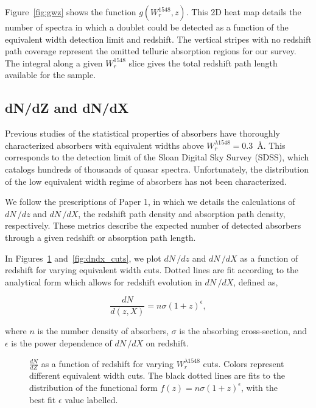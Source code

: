 \documentclass[linenumbers,twocolumn]{aastex61}
\begin{document}
Figure~\ref{fig:gwz} shows the function $g(W_r^{1548}, z)$. This 2D heat map details the number of spectra in which a {\CIVdblt} doublet could be detected as a function of the equivalent width detection limit and redshift. The vertical stripes with no redshift path coverage represent the omitted telluric absorption regions for our survey. The integral along a given $W_r^{1548}$ slice gives the total redshift path length available for the sample.

\subsection{dN/dZ and dN/dX}
\label{dndzdndx}

Previous studies of the statistical properties of {\CIV} absorbers have thoroughly characterized {\CIV} absorbers with equivalent widths above $W_r^{\lambda1548} = 0.3$~{\AA}. This corresponds to the detection limit of the Sloan Digital Sky Survey (SDSS), which catalogs hundreds of thousands of quasar spectra. Unfortunately, the distribution of the low equivalent width regime of {\CIV} absorbers has not been characterized.

We follow the prescriptions of Paper 1, in which we details the calculations of $dN\,/dz$ and $dN\,/dX$, the redshift path density and absorption path density, respectively. These metrics describe the expected number of detected absorbers through a given redshift or absorption path length.

In Figures~\ref{fig:dndz_cuts} and~\ref{fig:dndx_cuts}, we plot $dN\,/dz$ and $dN\,/dX$ as a function of redshift for varying equivalent width cuts. Dotted lines are fit according to the analytical form which allows for redshift evolution in $dN\,/dX$, defined as,

\begin{equation}
\frac{dN}{d(z,X)} = n\sigma (1 + z)^{\epsilon},
\label{eqn:dndxfit}
\end{equation}

where $n$ is the number density of {\CIV} absorbers, $\sigma$ is the absorbing cross-section, and $\epsilon$ is the power dependence of $dN\,/dX$ on redshift.

\begin{figure}[bth]
\caption{$\frac{dN}{dZ}$ as a function of redshift for varying $W_r^{\lambda1548}$ cuts. Colors represent different equivalent width cuts. The black dotted lines are fits to the distribution of the functional form $f(z) = n\sigma (1 + z)^{\epsilon}$, with the best fit $\epsilon$ value labelled.}
\label{fig:dndz_cuts}
\end{figure}
\end{document}
